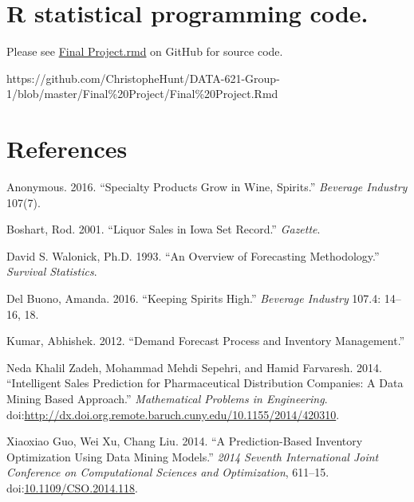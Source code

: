 \documentclass[]{elsarticle} %
\begin{document}
\section{R statistical programming
code.}\label{r-statistical-programming-code.}

Please see
\href{https://github.com/ChristopheHunt/DATA-621-Group-1/blob/master/Final\%20Project/Final\%20Project.Rmd}{Final
Project.rmd} on GitHub for source code.

https://github.com/ChristopheHunt/DATA-621-Group-1/blob/master/Final\%20Project/Final\%20Project.Rmd

\newpage

\section*{References}\label{references}

\hypertarget{refs}{}
\hypertarget{ref-SpecialityGrow3}{}
Anonymous. 2016. ``Specialty Products Grow in Wine, Spirits.''
\emph{Beverage Industry} 107(7).

\hypertarget{ref-IowaSetsRecord2}{}
Boshart, Rod. 2001. ``Liquor Sales in Iowa Set Record.'' \emph{Gazette}.

\hypertarget{ref-Forecast1}{}
David S. Walonick, Ph.D. 1993. ``An Overview of Forecasting
Methodology.'' \emph{Survival Statistics}.

\hypertarget{ref-KeepingSpiritsHigh1}{}
Del Buono, Amanda. 2016. ``Keeping Spirits High.'' \emph{Beverage
Industry} 107.4: 14--16, 18.

\hypertarget{ref-Demand1}{}
Kumar, Abhishek. 2012. ``Demand Forecast Process and Inventory
Management.''

\hypertarget{ref-Pharma2}{}
Neda Khalil Zadeh, Mohammad Mehdi Sepehri, and Hamid Farvaresh. 2014.
``Intelligent Sales Prediction for Pharmaceutical Distribution
Companies: A Data Mining Based Approach.'' \emph{Mathematical Problems
in Engineering}.
doi:\href{https://doi.org/http://dx.doi.org.remote.baruch.cuny.edu/10.1155/2014/420310}{http://dx.doi.org.remote.baruch.cuny.edu/10.1155/2014/420310}.

\hypertarget{ref-DataMining1}{}
Xiaoxiao Guo, Wei Xu, Chang Liu. 2014. ``A Prediction-Based Inventory
Optimization Using Data Mining Models.'' \emph{2014 Seventh
International Joint Conference on Computational Sciences and
Optimization}, 611--15.
doi:\href{https://doi.org/10.1109/CSO.2014.118}{10.1109/CSO.2014.118}.
\end{document}
